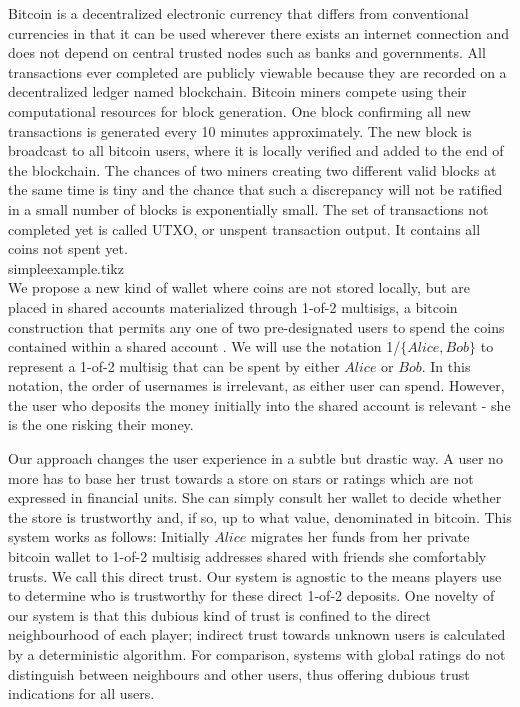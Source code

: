    Bitcoin is a decentralized electronic currency that differs from conventional currencies in that it can be used wherever
   there exists an internet connection and does not depend on central trusted nodes such as banks and governments. All
   transactions ever completed are publicly viewable because they are recorded on a decentralized ledger named blockchain.
   Bitcoin miners compete using their computational resources for block generation. One block confirming all new transactions
   is generated every 10 minutes approximately. The new block is broadcast to all bitcoin users, where it is locally
   verified and added to the end of the blockchain. The chances of two miners creating two different valid blocks at the same
   time is tiny and the chance that such a discrepancy will not be ratified in a small number of blocks is exponentially
   small. The set of transactions not completed yet is called UTXO, or unspent transaction output. It contains all coins not
   spent yet. \medskip \ \\
   {simpleexample.tikz} \smallskip \ \\
   We propose a new kind of wallet where coins are not stored locally, but are placed in shared accounts materialized through
   1-of-2 multisigs, a bitcoin construction that permits any one of two pre-designated users to spend the coins contained
   within a shared account \cite{masteringbitcoin}. We will use the notation 1/$\{Alice, Bob\}$ to represent a 1-of-2
   multisig that can be spent by either $Alice$ or $Bob$. In this notation, the order of usernames is irrelevant, as either
   user can spend. However, the user who deposits the money initially into the shared account is relevant - she is the one
   risking their money.

   Our approach changes the user experience in a subtle but drastic way. A user no more has to base her trust towards a
   store on stars or ratings which are not expressed in financial units. She can simply consult her wallet to decide whether
   the store is trustworthy and, if so, up to what value, denominated in bitcoin. This system works as follows: Initially
   $Alice$ migrates her funds from her private bitcoin wallet to 1-of-2 multisig addresses shared with friends she
   comfortably trusts. We call this direct trust. Our system is agnostic to the means players use to determine who is
   trustworthy for these direct 1-of-2 deposits. One novelty of our system is that this dubious kind of trust is confined to
   the direct neighbourhood of each player; indirect trust towards unknown users is calculated by a deterministic algorithm.
   For comparison, systems with global ratings do not distinguish between neighbours and other users, thus offering dubious
   trust indications for all users.

